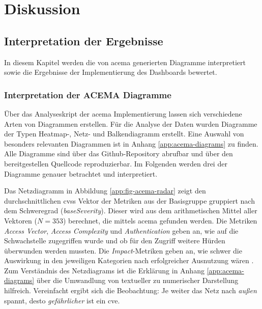 \chapter{Diskussion}
\label{chap:diskussion}
\section{Interpretation der Ergebnisse}
\label{sec:interpretation}
In diesem Kapitel werden die von \gls{acema} generierten Diagramme interpretiert sowie die Ergebnisse der Implementierung des Dashboards bewertet.
\subsection{Interpretation der ACEMA Diagramme}
\label{sec:interpretation-acema}
Über das Analyseskript der \gls{acema} Implementierung lassen sich verschiedene Arten von Diagrammen erstellen. Für die Analyse der Daten wurden Diagramme der Typen Heatmap-, Netz- und Balkendiagramm erstellt. Eine Auswahl von besonders relevanten Diagrammen ist in Anhang \ref{app:acema-diagrams} zu finden. Alle Diagramme sind über das Github-Repository \autocite{jesseDumpeldownAcema_oranDev} abrufbar und über den bereitgestellen Quellcode reproduzierbar. Im Folgenden werden drei der Diagramme genauer betrachtet und interpretiert.
\par Das Netzdiagramm in Abbildung \ref{app:fig-acema-radar} zeigt den durchschnittlichen \gls{cvss} Vektor der Metriken aus der Basisgruppe gruppiert nach dem Schweregrad (\textit{baseSeverity}). Dieser wird aus dem arithmetischen Mittel aller Vektoren (\(N = 353\)) berechnet, die mittels \gls{acema} gefunden werden. Die Metriken \textit{Access Vector}, \textit{Access Complexity} und \textit{Authentication} geben an, wie auf die Schwachstelle zugegriffen wurde und ob für den Zugriff weitere Hürden überwunden werden mussten. Die \textit{Impact}-Metriken geben an, wie schwer die Auswirkung in den jeweiligen Kategorien nach erfolgreicher Ausnutzung wären \autocite{CVSSV2Complete}. Zum Verständnis des Netzdiagrams ist die Erklärung in Anhang \ref{app:acema-diagrams} über die Umwandlung von textueller zu numerischer Darstellung hilfreich. Vereinfacht ergibt sich die Beobachtung: Je weiter das Netz nach \textit{außen} spannt, desto \textit{gefährlicher} ist ein \gls{cve}.
